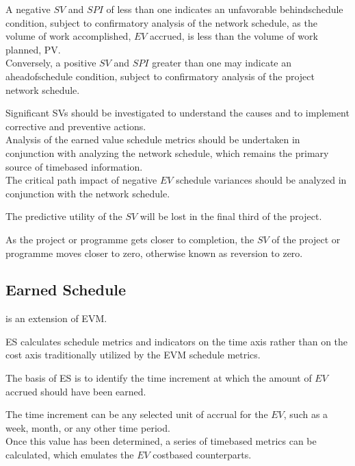 \documentclass[letterpaper,10pt,english]{jupyterBook}
\begin{document}
\sphinxAtStartPar
A negative \(SV\) and \(SPI\) of less than one indicates an unfavorable behind\sphinxhyphen{}schedule condition, subject to confirmatory analysis of the network schedule, as the volume of work accomplished, \(EV\) accrued, is less than the volume of work planned, PV. \\
Conversely, a positive \(SV\) and \(SPI\) greater than one may indicate an ahead\sphinxhyphen{}of\sphinxhyphen{}schedule condition, subject to confirmatory analysis of the project network schedule.

\sphinxAtStartPar
Significant SVs should be investigated to understand the causes and to implement corrective and preventive actions. \\
Analysis of the earned value schedule metrics should be undertaken in conjunction with analyzing the network schedule, which remains the primary source of time\sphinxhyphen{}based information. \\
The critical path impact of negative \(EV\) schedule variances should be analyzed in conjunction with the network schedule.

\sphinxAtStartPar
The predictive utility of the \(SV\) will be lost in the final third of the project.

\sphinxAtStartPar
As the project or programme gets closer to completion, the \(SV\) of the project or programme moves closer to zero, otherwise known as reversion to zero.


\subsection{Earned Schedule}
\label{\detokenize{PM/evm:earned-schedule}}
\sphinxAtStartPar
{} is an extension of EVM.

\sphinxAtStartPar
ES calculates schedule metrics and indicators on the time axis rather than on the cost axis traditionally utilized by the EVM schedule metrics.

\sphinxAtStartPar
The basis of ES is to identify the time increment at which the amount of \(EV\) accrued should have been earned.

\sphinxAtStartPar
The time increment can be any selected unit of accrual for the \(EV\), such as a week, month, or any other time period. \\
Once this value has been determined, a series of time\sphinxhyphen{}based metrics can be calculated, which emulates the \(EV\) cost\sphinxhyphen{}based counterparts.
\end{document}
